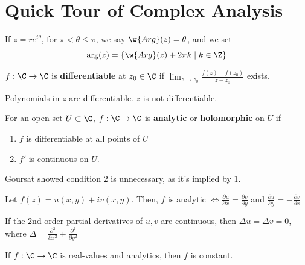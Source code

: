 \section{Quick Tour of Complex Analysis}

\begin{defn}
    If $z=re^{i \theta}$, for $\pi < \theta \leq \pi$, we say $\w{Arg}(z) = \theta$, and we set
    $$\arg (z) = \{ \w{Arg}(z) + 2\pi k \mid k \in \Z\}$$
\end{defn}

\begin{defn}
    $f:\C \to \C$ is \textbf{differentiable} at $z_0 \in \C$ if $\lim_{z \to z_0}\frac{f(z)-f(z_0)}{z-z_0}$ exists.
\end{defn}

\begin{ex}
    Polynomials in $z$ are differentiable. $\bar z$ is not differentiable.
\end{ex}

\begin{defn}
    For an open set $U \subset \C$, $f:\C \to \C$ is \textbf{analytic} or \textbf{holomorphic} on $U$ if
    \begin{enumerate}
        \item $f$ is differentiable at all points of $U$
        \item $f'$ is continuous on $U$.
    \end{enumerate}
\end{defn}

\begin{rmk}
    Goursat showed condition $2$ is unnecessary, as it's implied by $1$.
\end{rmk}

\begin{thm}
    Let $f(z) = u(x,y)+iv(x,y)$. Then, $f$ is analytic $\iff \frac{\partial u}{\partial x}=\frac{\partial v}{\partial y}$ and $\frac{\partial u}{\partial y}=-\frac{\partial v}{\partial x}$
\end{thm}

\begin{cor}
    If the 2nd order partial derivatives of $u,v$ are continuous, then $\Delta u=\Delta v=0$, where $\Delta =\frac{\partial ^2}{\partial x^2}+\frac{\partial ^2}{\partial y^2}$
\end{cor}

\begin{cor}
    If $f:\C \to \C$ is real-values and analytics, then $f$ is constant.
\end{cor}

